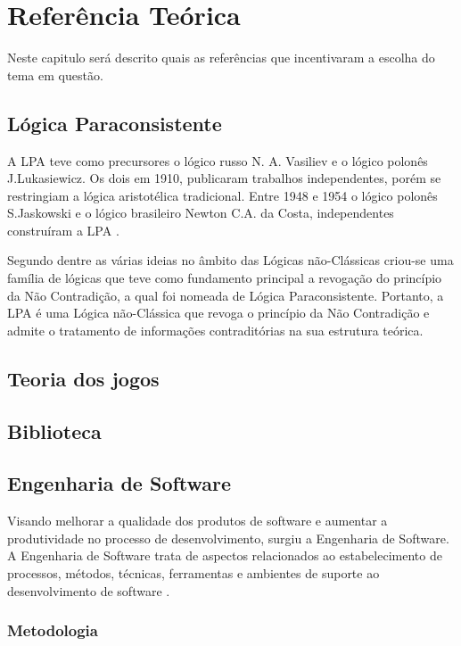 
\chapter{Referência Teórica}

Neste capitulo será descrito quais as referências que incentivaram a escolha do tema em questão.

\section{Lógica Paraconsistente}

A LPA teve como precursores o lógico russo N. A. Vasiliev e o lógico polonês J.Lukasiewicz. Os dois em 1910, publicaram trabalhos independentes, porém se restringiam a lógica aristotélica tradicional. Entre 1948 e 1954 o lógico polonês S.Jaskowski e o lógico brasileiro Newton C.A. da Costa, independentes construíram a LPA \cite[p. 27]{tomda-decisao-lpa-2011}.

Segundo  dentre as várias ideias no âmbito das Lógicas não-Clássicas criou-se uma família de lógicas que teve como fundamento principal a  revogação do princípio da Não Contradição, a qual foi nomeada de Lógica Paraconsistente. Portanto, a LPA é uma Lógica não-Clássica que
revoga o princípio da Não Contradição e admite o tratamento de informações
contraditórias na sua estrutura teórica.

\section{Teoria dos jogos}

\section{Biblioteca}

\section{Engenharia de Software}

Visando melhorar a qualidade dos produtos de software e aumentar a produtividade no processo de desenvolvimento, surgiu a Engenharia de Software. A Engenharia de Software trata de aspectos relacionados ao estabelecimento de processos, métodos, técnicas, ferramentas e ambientes de suporte ao desenvolvimento de software \cite[p. 2]{eng-2014}.

\subsection{Metodologia}


